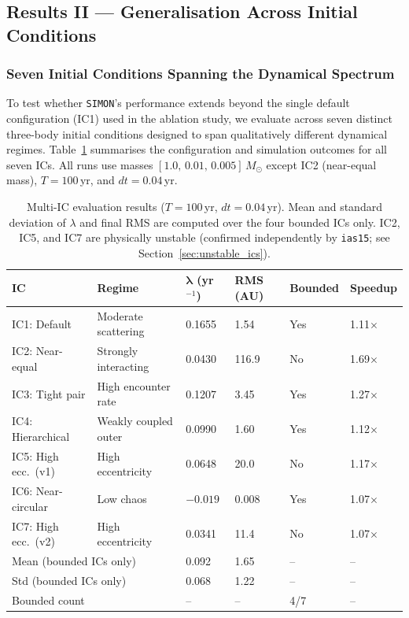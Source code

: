 \documentclass[12pt]{article}
\begin{document}

\subsection{Results II --- Generalisation Across Initial Conditions}
\label{sec:generalisation}

\subsubsection{Seven Initial Conditions Spanning the Dynamical Spectrum}

To test whether \texttt{SIMON}'s performance extends beyond the single default
configuration (IC1) used in the ablation study, we evaluate across seven distinct
three-body initial conditions designed to span qualitatively different dynamical
regimes. Table~\ref{tab:multi_ic} summarises the configuration and simulation outcomes
for all seven ICs. All runs use masses $[1.0,\,0.01,\,0.005]\,M_\odot$ except IC2
(near-equal mass), $T = 100$\,yr, and $dt = 0.04$\,yr.

\begin{table}[H]
\centering
\caption{Multi-IC evaluation results ($T = 100$\,yr, $dt = 0.04$\,yr). Mean and
standard deviation of $\lambda$ and final RMS are computed over the four bounded ICs
only. IC2, IC5, and IC7 are physically unstable (confirmed independently by
\texttt{ias15}; see Section~\ref{sec:unstable_ics}).}
\label{tab:multi_ic}
\begin{tabular}{@{}llllll@{}}
\toprule
\textbf{IC} & \textbf{Regime} & $\boldsymbol{\lambda}$ (yr$^{-1}$) & \textbf{RMS (AU)} & \textbf{Bounded} & \textbf{Speedup} \\
\midrule
IC1: Default & Moderate scattering & 0.1655 & 1.54 & Yes & 1.11$\times$ \\
IC2: Near-equal & Strongly interacting & 0.0430 & 116.9 & No & 1.69$\times$ \\
IC3: Tight pair & High encounter rate & 0.1207 & 3.45 & Yes & 1.27$\times$ \\
IC4: Hierarchical & Weakly coupled outer & 0.0990 & 1.60 & Yes & 1.12$\times$ \\
IC5: High ecc.\ (v1) & High eccentricity & 0.0648 & 20.0 & No & 1.17$\times$ \\
IC6: Near-circular & Low chaos & $-0.019$ & 0.008 & Yes & 1.07$\times$ \\
IC7: High ecc.\ (v2) & High eccentricity & 0.0341 & 11.4 & No & 1.07$\times$ \\
\midrule
\multicolumn{2}{l}{Mean (bounded ICs only)} & 0.092 & 1.65 & -- & -- \\
\multicolumn{2}{l}{Std (bounded ICs only)} & 0.068 & 1.22 & -- & -- \\
\multicolumn{2}{l}{Bounded count} & -- & -- & 4/7 & -- \\
\bottomrule
\end{tabular}
\end{table}
\end{document}
